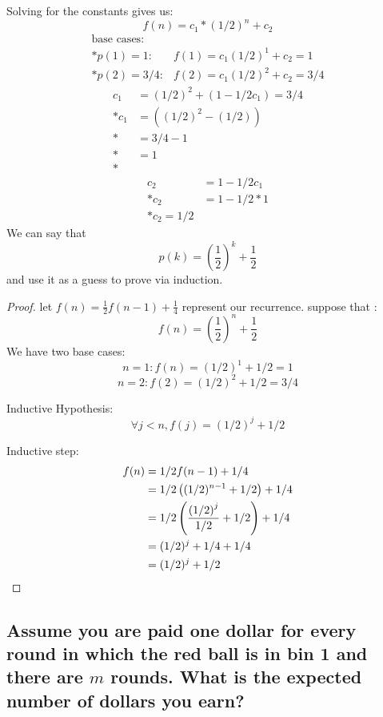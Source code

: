 \documentclass[titlepage]{article}
\theoremstyle{definition}
\begin{document}
    Solving for the constants gives us:
    \[ f(n) = c_1 * (1/2)^n + c_2 \]
    \begin{align*}
      \text{base cases}: \\*
      p(1) = 1: & f(1) = c_1 (1/2)^1 + c_2 = 1  \\*
      p(2) = 3/4: & f(2) = c_1 (1/2)^2 + c_2 = 3/4
    \end{align*}
    \begin{align*}
      c_1 &= (1/2)^2 + (1 - 1/2 c_1) = 3/4 \\*
      c_1 &= \left( (1/2)^2 - (1/2)\right) \\*
          &= 3/4 - 1 \\*
          &= 1 \\*
    \end{align*}
    \begin{align*}
      c_2 &= 1 - 1/2 c_1 \\*
      c_2 &= 1 - 1/2 * 1 \\*
      c_2 = 1/2
    \end{align*}
  We can say that 
  \[ p(k) = \left(\frac{1}{2}\right)^k + \frac{1}{2} \]
  and use it as a guess to prove via induction.
  \begin{proof}
    let $f(n) = \frac{1}{2} f(n-1) + \frac{1}{4}$ represent our recurrence. 
    suppose that :
    \[ f(n) = \left(\frac{1}{2}\right)^n + \frac{1}{2} \]
    We have two base cases:
    \[ n =1: f(n) = (1/2)^1 + 1/2 = 1 \]
    \[ n = 2: f(2) = (1/2)^2 + 1/2 = 3/4 \]

    Inductive Hypothesis:
    \[ \forall j < n, f(j) = (1/2)^j + 1/2 \]

    Inductive step:
    \begin{align*}
      f(n) &= 1/2 f(n-1) + 1/4 \\*
      &= 1/2\left( (1/2)^{n-1} + 1/2 \right) + 1/4 \\*
      &= 1/2 \left( \frac{\left(1/2\right)^j}{1/2} + 1/2 \right) + 1/4 \\*
      &= (1/2)^j + 1/4 + 1/4 \\*
      &= (1/2)^j + 1/2 \qedhere
    \end{align*}
  \end{proof}


  \subsection{Assume you are paid one dollar for every round in which the red
    ball is in bin 1 and there are $m$ rounds. What is the expected number of
    dollars you earn?}
\end{document}
